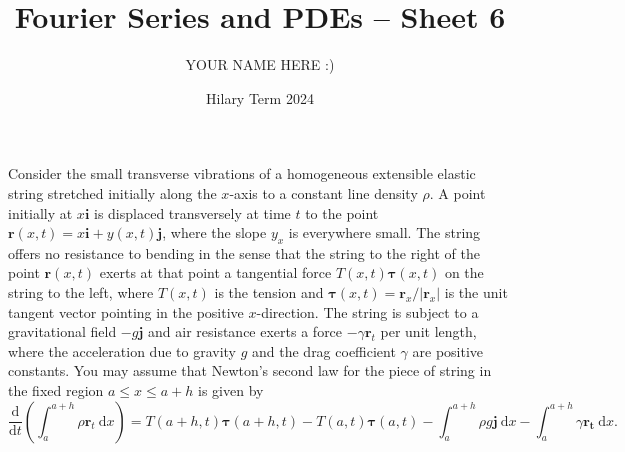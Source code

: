 \documentclass[answers]{exam}
\title{Fourier Series and PDEs -- Sheet 6}
\author{YOUR NAME HERE :)}
\date{Hilary Term 2024}
\begin{document}
\maketitle
\begin{questions}

\question%
Consider the small transverse vibrations of a homogeneous extensible elastic string stretched initially along the $x$-axis to a constant line density $\rho$. A point initially at $x \boldsymbol{i}$ is displaced transversely at time $t$ to the point $\boldsymbol{r}(x, t)=x \boldsymbol{i}+y(x, t) \boldsymbol{j}$, where the slope $y_{x}$ is everywhere small. The string offers no resistance to bending in the sense that the string to the right of the point $\boldsymbol{r}(x, t)$ exerts at that point a tangential force $T(x, t) \boldsymbol{\tau}(x, t)$ on the string to the left, where $T(x, t)$ is the tension and $\boldsymbol{\tau}(x, t)=\boldsymbol{r}_{x} /\left|\boldsymbol{r}_{x}\right|$ is the unit tangent vector pointing in the positive $x$-direction. The string is subject to a gravitational field $-g \boldsymbol{j}$ and air resistance exerts a force $-\gamma \boldsymbol{r}_{t}$ per unit length, where the acceleration due to gravity $g$ and the drag coefficient $\gamma$ are positive constants. You may assume that Newton's second law for the piece of string in the fixed region $a \leq x \leq a+h$ is given by \[
	\frac{\mathrm{d}}{\mathrm{d} t}\left(\int_{a}^{a+h} \rho \boldsymbol{r}_{t} \mathrm{~d} x\right)=T(a+h, t) \boldsymbol{\tau}(a+h, t)-T(a, t) \boldsymbol{\tau}(a, t)-\int_{a}^{a+h} \rho g \boldsymbol{j} \mathrm{~d} x-\int_{a}^{a+h} \gamma \boldsymbol{r}_{\boldsymbol{t}} \mathrm{~d} x.
\]
\end{questions}
\end{document}
